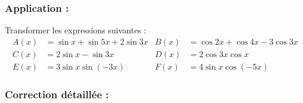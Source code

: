 \documentclass[12pt,a4paper]{article}
\begin{document}
\subsubsection*{\textcolor{myblue}{Application :}}
Transformer les expressions suivantes :
\begin{align*}
A(x) &= \sin x + \sin 5x + 2 \sin 3x & B(x) &= \cos 2x + \cos 4x - 3 \cos 3x \\
C(x) &= 2 \sin x - \sin 3x & D(x) &= 2 \cos 3x \cos x \\
E(x) &= 3 \sin x \sin(-3x) & F(x) &= 4 \sin x \cos(-5x)
\end{align*}


\vspace{0.5cm}

\subsubsection*{\textcolor{myblue}{Correction détaillée :}}
\end{document}
